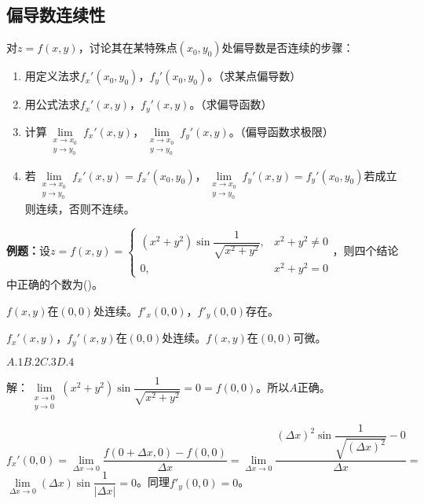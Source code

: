 \documentclass[UTF8, 12pt]{ctexart}
\begin{document}
        \subsection{偏导数连续性}

        对$z=f(x,y)$，讨论其在某特殊点$(x_0,y_0)$处偏导数是否连续的步骤：

        \begin{enumerate}
            \item 用定义法求$f_x'(x_0,y_0)$，$f_y'(x_0,y_0)$。（求某点偏导数）
            \item 用公式法求$f_x'(x,y)$，$f_y'(x,y)$。（求偏导函数）
            \item 计算$\lim\limits_{\substack{x\to x_0\\y\to y_0}}f_x'(x,y)$，$\lim\limits_{\substack{x\to x_0\\y\to y_0}}f_y'(x,y)$。（偏导函数求极限）
            \item 若$\lim\limits_{\substack{x\to x_0\\y\to y_0}}f_x'(x,y)=f_x'(x_0,y_0)$，$\lim\limits_{\substack{x\to x_0\\y\to y_0}}f_y'(x,y)=f_y'(x_0,y_0)$若成立则连续，否则不连续。
        \end{enumerate}

        \textbf{例题：}设$z=f(x,y)=\left\{\begin{array}{ll}
        (x^2+y^2)\sin\dfrac{1}{\sqrt{x^2+y^2}}, & x^2+y^2\neq0 \\
        0, & x^2+y^2=0
        \end{array}\right.$，则四个结论中正确的个数为()。

        $f(x,y)$在$(0,0)$处连续。\qquad{}$f'_x(0,0)$，$f'_y(0,0)$存在。

        $f_x'(x,y)$，$f_y'(x,y)$在$(0,0)$处连续。\qquad{}$f(x,y)$在$(0,0)$可微。

        $A.1$\qquad$B.2$\qquad$C.3$\qquad$D.4$

        解：$\lim\limits_{\substack{x\to0\\y\to0}}(x^2+y^2)\sin\dfrac{1}{\sqrt{x^2+y^2}}=0=f(0,0)$。所以$A$正确。

        $f_x'(0,0)=\lim\limits_{\Delta x\to0}\dfrac{f(0+\Delta x,0)-f(0,0)}{\Delta x}=\lim\limits_{\Delta x\to0}\dfrac{(\Delta x)^2\sin\dfrac{1}{\sqrt{(\Delta x)^2}}-0}{\Delta x}=$\\$\lim\limits_{\Delta x\to0}(\Delta x)\sin\dfrac{1}{\vert\Delta x\vert}=0$。同理$f'_y(0,0)=0$。
\end{document}

